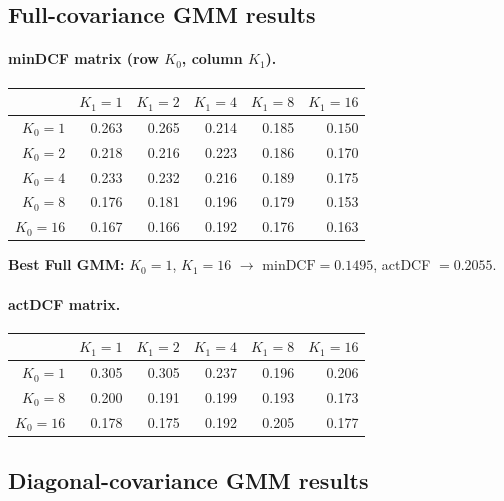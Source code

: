 \documentclass[11pt,a4paper]{article}
\newcommand{\minDCF}{\textrm{minDCF}}
\begin{document}
\subsection{Full-covariance GMM results}

\paragraph{minDCF matrix (row $K_0$, column $K_1$).}

\begin{table}[H]
\centering
\begin{tabular}{rrrrrr}
\toprule
            & $K_1=1$ & $K_1=2$ & $K_1=4$ & $K_1=8$ & $K_1=16$ \\
\midrule
$K_0=1$     & 0.263 & 0.265 & 0.214 & 0.185 & $\mathbf{0.150}$ \\
$K_0=2$     & 0.218 & 0.216 & 0.223 & 0.186 & 0.170 \\
$K_0=4$     & 0.233 & 0.232 & 0.216 & 0.189 & 0.175 \\
$K_0=8$     & 0.176 & 0.181 & 0.196 & 0.179 & 0.153 \\
$K_0=16$    & 0.167 & 0.166 & 0.192 & 0.176 & 0.163 \\
\bottomrule
\end{tabular}
\end{table}

\textbf{Best Full GMM:} $K_0=1$, $K_1=16$ $\rightarrow$
$\minDCF = 0.1495$, actDCF $= 0.2055$.

\paragraph{actDCF matrix.}
\begin{table}[H]
\centering
\begin{tabular}{rrrrrr}
\toprule
            & $K_1=1$ & $K_1=2$ & $K_1=4$ & $K_1=8$ & $K_1=16$ \\
\midrule
$K_0=1$     & 0.305 & 0.305 & 0.237 & 0.196 & 0.206 \\
$K_0=8$     & 0.200 & 0.191 & 0.199 & 0.193 & 0.173 \\
$K_0=16$    & 0.178 & 0.175 & 0.192 & 0.205 & 0.177 \\
\bottomrule
\end{tabular}
\end{table}

\subsection{Diagonal-covariance GMM results}
\end{document}
